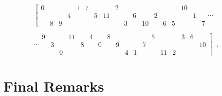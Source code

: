 \begin{example}
\begin{multline}
        \left[
        \begin{array}{cccccccccccc|cccccc}
        	0 &&&& 1 & 7 &&& 2 &&&&&&& 10 && \\
        	&&& 4 &&& 5 & 11 &&& 6 && 2 &&&& 1 & \\
        	& 8 & 9 &&&&&&& 3 && 10 && 6 & 5 &&& 7
        \end{array}
        \right. \cdots \\\\
        \cdots \left.
        \begin{array}{cccccc|cccccccccccc}
        	9 &&& 11 && 4 && 8 &&&&& 5 &&& 3 & 6 & \\
        	& 3 &&& 8 && 0 && 9 &&& 7 &&&&&& 10 \\
        	&& 0 &&&&&&& 4 & 1 &&& 11 & 2 &&&
        \end{array}
        \right] \enspace.
    \end{multline}
\end{example}

\section{Final Remarks}

